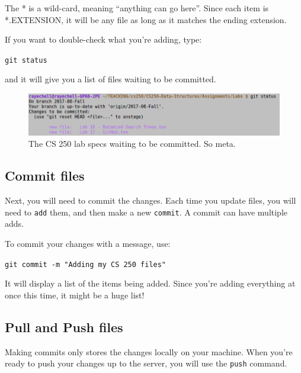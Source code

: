\documentclass[a4paper,12pt,oneside]{book}
\begin{document}
        The * is a wild-card, meaning ``anything can go here''. Since each
        item is *.EXTENSION, it will be any file as long as it matches the
        ending extension.

        If you want to double-check what you're adding, type:

        \begin{center}
            \texttt{git status}
        \end{center}

        and it will give you a list of files waiting to be committed.

        \begin{figure}[h]
            \centering
            \includegraphics[width=14cm]{images/git-status.png}
            \caption{The CS 250 lab specs waiting to be committed. So meta.}
        \end{figure}

        \subsection{Commit files}

        Next, you will need to commit the changes. Each time you update
        files, you will need to \texttt{add} them, and then make a new
        \texttt{commit}. A commit can have multiple adds.

        To commit your changes with a message, use:

        \begin{center}
            \texttt{git commit -m "Adding my CS 250 files"}
        \end{center}

        It will display a list of the items being added. Since you're
        adding everything at once this time, it might be a huge list!

    \newpage

        \subsection{Pull and Push files}

        Making commits only stores the changes locally on your machine.
        When you're ready to push your changes up to the server, you will
        use the \texttt{push} command.
\end{document}
